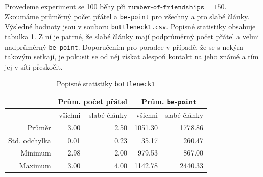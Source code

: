 \documentclass[a4wide,12pt]{report}
\begin{document}
Provedeme experiment se 100 běhy při $\texttt{number-of-friendships}=150$. Zkoumáme průměrný počet přátel a \texttt{be-point} pro všechny a pro slabé články. Výsledné hodnoty jsou v souboru \texttt{bottleneck1.csv}. Popisné statistiky obsahuje tabulka \ref{tab:bottleneck1_desc}. Z ní je patrné, že slabé články mají podprůměrný počet přátel a velmi nadprůměrný \texttt{be-point}. Doporučením pro poradce v případě, že se s nekým takovým setkají, je pokusit se od něj získat alespoň kontakt na jeho známé a tím jej v síti přeskočit.
\begin{table}[h]
  \begin{center}
  \begin{tabular}{|r|r|r|r|r|}
  \hline
   & \multicolumn{2}{|c|}{Prům. počet přátel} & \multicolumn{2}{|c|}{Prům. \texttt{be-point}} \\\hline
	  &všichni	&slabé články	&všichni	&slabé články\\\hline
  Průměr	&3.00	&2.50	&1051.30	&1778.86\\
  Std. odchylka	&0.01	&0.23	&35.17	&260.47\\
  Minimum	&2.98	&2.00	&979.53	&867.00\\
  Maximum	&3.00	&4.00	&1142.78	&2440.33\\\hline
  \end{tabular}
  \end{center}
  \caption{Popisné statistiky \texttt{bottleneck1}}
  \label{tab:bottleneck1_desc}
\end{table}
\end{document}
